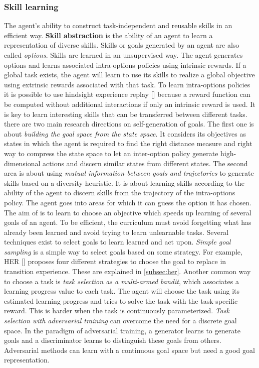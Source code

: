 \documentclass[conference]{IEEEtran}
\begin{document}
\subsubsection{Skill learning} \label{subsubsec:skill_learning}
The agent's ability to construct task-independent and reusable skills in an efficient way. \textbf{Skill abstraction} is the ability of an agent to learn a representation of diverse skills. Skills or goals generated by an agent are also called \textit{options}. Skills are learned in an unsupervised way. The agent generates options and learns associated intra-options policies using intrinsic rewards. If a global task exists, the agent will learn to use its skills to realize a global objective using extrinsic rewards associated with that task. To learn intra-options policies it is possible to use hindsight experience replay [\cite{andrychowicz2017hindsight}] because a reward function can be computed without additional interactions if only an intrinsic reward is used. It is key to learn interesting skills that can be transferred between different tasks. there are two main research directions on self-generation of goals. The first one is about \textit{building the goal space from the state space}. It considers its objectives as states in which the agent is required to find the right distance measure and right way to compress the state space to let an inter-option policy generate high-dimensional actions and discern similar states from different states. The second area is about using \textit{mutual information between goals and trajectories} to generate skills based on a diversity heuristic. It is about learning skills according to the ability of the agent to discern skills from the trajectory of the intra-options policy. The agent goes into areas for which it can guess the option it has chosen. The aim of  is to learn to choose an objective which speeds up learning of several goals of an agent. To be efficient, the curriculum must avoid forgetting what has already been learned and avoid trying to learn unlearnable tasks. Several techniques exist to select goals to learn learned and act upon. \textit{Simple goal sampling} is a simple way to select goals based on some strategy. For example, HER [\cite{andrychowicz2017hindsight}] proposes four different strategies to choose the goal to replace in transition experience. These are explained in \ref{subsec:her}. Another common way to choose a task is \textit{task selection as a multi-armed bandit}, which associates a learning progress value to each task. The agent will choose the task using its estimated learning progress and tries to solve the task with the task-specific reward. This is harder when the task is continuously parameterized. \textit{Task selection with adversarial training} can overcome the need for a discrete goal space. In the paradigm of adversarial training, a generator learns to generate goals and a discriminator learns to distinguish these goals from others. Adversarial methods can learn with a continuous goal space but need a good goal representation.
\end{document}
